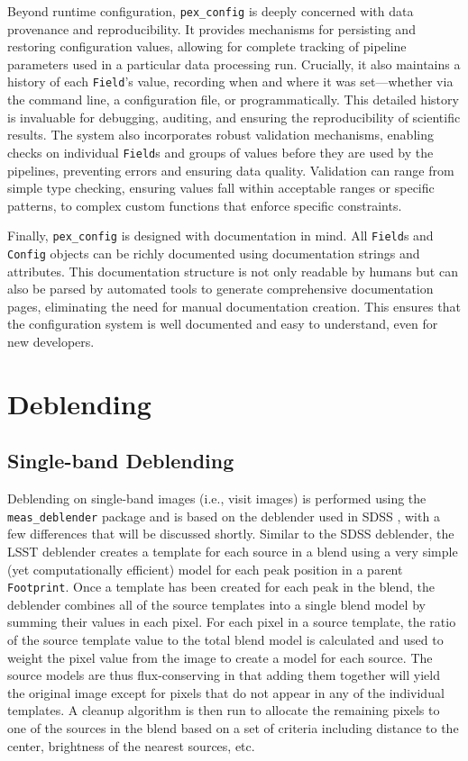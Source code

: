 Beyond runtime configuration, \texttt{pex\_config} is deeply concerned with data provenance and reproducibility.
It provides mechanisms for persisting and restoring configuration values, allowing for complete tracking of pipeline parameters used in a particular data processing run.
Crucially, it also maintains a history of each \texttt{Field}'s value, recording when and where it was set---whether via the command line, a configuration file, or programmatically.
This detailed history is invaluable for debugging, auditing, and ensuring the reproducibility of scientific results.
The system also incorporates robust validation mechanisms, enabling checks on individual \texttt{Field}s and groups of values before they are used by the pipelines, preventing errors and ensuring data quality.
Validation can range from simple type checking, ensuring values fall within acceptable ranges or specific patterns, to complex custom functions that enforce specific constraints.


Finally, \texttt{pex\_config} is designed with documentation in mind.
All \texttt{Field}s and \texttt{Config} objects can be richly documented using documentation strings and attributes.
This documentation structure is not only readable by humans but can also be parsed by automated tools to generate comprehensive documentation pages, eliminating the need for manual documentation creation.
This ensures that the configuration system is well documented and easy to understand, even for new developers.


\section{Deblending}
\label{app:deblending}

\subsection{Single-band Deblending}
\label{sec:singleband_deblending}

Deblending on single-band images (i.e., visit images) is performed using the \texttt{meas\_deblender} package and is based on the deblender used in SDSS \citep{rhldeblend}, with a few differences that will be discussed shortly.
Similar to the SDSS deblender, the LSST deblender creates a template for each source in a blend using a very simple (yet computationally efficient) model for each peak position in a parent \texttt{Footprint}.
Once a template has been created for each peak in the blend, the deblender combines all of the source templates into a single blend model by summing their values in each pixel.
For each pixel in a source template, the ratio of the source template value to the total blend model is calculated and used to weight the pixel value from the image to create a model for each source.
The source models are thus flux-conserving in that adding them together will yield the original image except for pixels that do not appear in any of the individual templates.
A cleanup algorithm is then run to allocate the remaining pixels to one of the sources in the blend based on a set of criteria including distance to the center, brightness of the nearest sources, etc.

